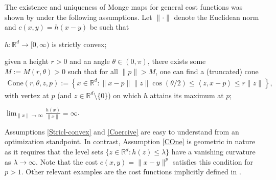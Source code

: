 \documentclass[11pt]{article}
\newcommand{\RR}{\mathbb{R}}
\newcommand{\R}{\RR}
\theoremstyle{plain}
\theoremstyle{definition}\newtheorem{definition}[theorem]{Definition}
\theoremstyle{remark}
\begin{document}
   The existence and uniqueness of Monge  maps for general cost functions was shown by \cite{GangboMcCann.96} under the following assumptions.  Let $\|\cdot\|$ denote the Euclidean norm and $c(x,y)=h(x-y)$ be such that  
\begin{assumptions}
%
\item\label{Stricl-convex} 
$h: \R^d\to [0, \infty)$ is strictly convex;
%
\item\label{COne} 
given a height $r>0$ and an angle $\theta \in (0,\pi) $, there exists some $M:=M(r, \theta)>0$ such that for all $\|{p} \|>M$, one can find a (truncated) cone 
	\begin{align*}
		\mathrm{Cone}(r, \theta, {z},{p}):=\left\lbrace {x}\in \R^d : \| {x}-{p}\|\| {z}\|\cos(\theta/2)\leq \left\langle {z},{x}-{p} \right\rangle\leq  r\| {z}\| \right\rbrace,
	\end{align*}
	with vertex at ${p}$ (and $ { z}\in \R^d \setminus \{{0}\}$) on which $h$ attains its maximum at ${p}$;
%
\item\label{Coercive} 
$\lim_{\|{x} \| \rightarrow \infty}\frac{h({x})}{\|{x} \| }= \infty $.
%
\end{assumptions}
%
Assumptions \ref{Stricl-convex} and \ref{Coercive} are easy to understand from an optimization standpoint. In contrast, Assumption \ref{COne} is geometric in nature as it requires that the level sets $ \{ z \in \mathbb{R}^d : h(z) \leq \lambda \}$ have a vanishing curvature as $\lambda\to\infty$. Note that the cost $c(x,y)=\|x-y\|^p$ satisfies this condition for $p>1$. Other relevant examples are the cost functions implicitly defined in \cite[p.~1151]{catoni2012}.
\end{document}
